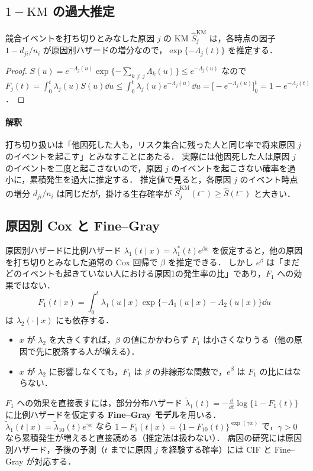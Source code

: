 \subsection{\texorpdfstring{$1-\mathrm{KM}$}{1−KM} の過大推定}
競合イベントを打ち切りとみなした原因 $j$ の KM $\hat S_j^{\mathrm{KM}}$ は，各時点の因子 $1-d_{ji}/n_i$ が原因別ハザードの増分なので，$\exp\{-\Lambda_j(t)\}$ を推定する．
\begin{proof}
$S(u)=e^{-\Lambda_j(u)}\exp\{-\sum_{k\ne j}\Lambda_k(u)\}\le e^{-\Lambda_j(u)}$ なので
$F_j(t)=\int_0^t\lambda_j(u)S(u)\dd u\le\int_0^t\lambda_j(u)e^{-\Lambda_j(u)}\dd u=\bigl[-e^{-\Lambda_j(u)}\bigr]_0^t=1-e^{-\Lambda_j(t)}$．
\end{proof}
\paragraph{解釈}
打ち切り扱いは「他因死した人も，リスク集合に残った人と同じ率で将来原因 $j$ のイベントを起こす」とみなすことにあたる．
実際には他因死した人は原因 $j$ のイベントを二度と起こさないので，原因 $j$ のイベントを起こさない確率を過小に，累積発生を過大に推定する．
推定値で見ると，各原因 $j$ のイベント時点の増分 $d_{ji}/n_i$ は同じだが，掛ける生存確率が $\hat S_j^{\mathrm{KM}}(t^-)\ge\hat S(t^-)$ と大きい．

\subsection{原因別 Cox と Fine--Gray}
原因別ハザードに比例ハザード $\lambda_1(t\mid x)=\lambda_1^*(t)e^{\beta x}$ を仮定すると，他の原因を打ち切りとみなした通常の Cox 回帰で $\beta$ を推定できる．
しかし $e^\beta$ は「まだどのイベントも起きていない人における原因1の発生率の比」であり，$F_1$ への効果ではない．
\[
F_1(t\mid x)=\int_0^t\lambda_1(u\mid x)\exp\{-\Lambda_1(u\mid x)-\Lambda_2(u\mid x)\}\dd u
\]
は $\lambda_2(\cdot\mid x)$ にも依存する．
\begin{itemize}
\item $x$ が $\lambda_2$ を大きくすれば，$\beta$ の値にかかわらず $F_1$ は小さくなりうる（他の原因で先に脱落する人が増える）．
\item $x$ が $\lambda_2$ に影響しなくても，$F_1$ は $\beta$ の非線形な関数で，$e^\beta$ は $F_1$ の比にはならない．
\end{itemize}
$F_1$ への効果を直接表すには，部分分布ハザード $\tilde\lambda_1(t)=-\frac{\dd}{\dd t}\log\{1-F_1(t)\}$ に比例ハザードを仮定する \textbf{Fine--Gray モデル}を用いる．
$\tilde\lambda_1(t\mid x)=\tilde\lambda_{10}(t)e^{\gamma x}$ なら $1-F_1(t\mid x)=\{1-F_{10}(t)\}^{\exp(\gamma x)}$ で，$\gamma>0$ なら累積発生が増えると直接読める（推定法は扱わない）．
病因の研究には原因別ハザード，予後の予測（$t$ までに原因 $j$ を経験する確率）には CIF と Fine--Gray が対応する．

